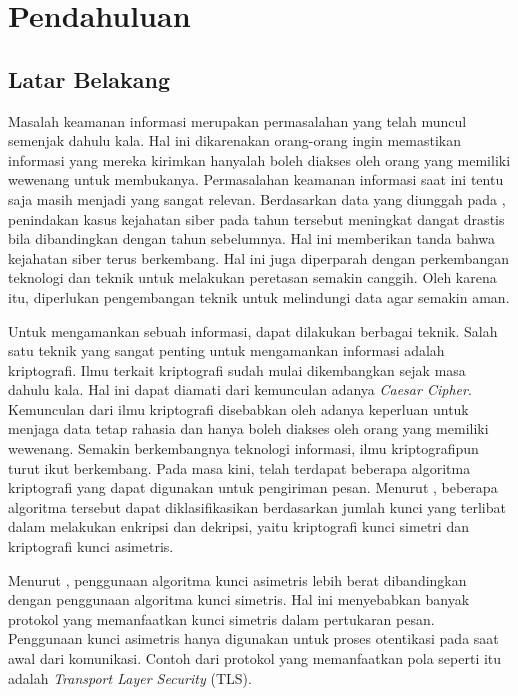 \chapter{Pendahuluan}

\section{Latar Belakang}
Masalah keamanan informasi merupakan permasalahan yang telah muncul semenjak dahulu kala. Hal ini dikarenakan orang-orang ingin memastikan informasi yang mereka kirimkan hanyalah boleh diakses oleh orang yang memiliki wewenang untuk membukanya. Permasalahan keamanan informasi saat ini tentu saja masih menjadi yang sangat relevan. Berdasarkan data yang diunggah pada \textcite{pusiknaspolri_cybercrime_2022}, penindakan kasus kejahatan siber pada tahun tersebut meningkat dangat drastis bila dibandingkan dengan tahun sebelumnya. Hal ini memberikan tanda bahwa kejahatan siber terus berkembang. Hal ini juga diperparah dengan perkembangan teknologi dan teknik untuk melakukan peretasan semakin canggih. Oleh karena itu, diperlukan pengembangan teknik untuk melindungi data agar semakin aman.

Untuk mengamankan sebuah informasi, dapat dilakukan berbagai teknik. Salah satu teknik yang sangat penting untuk mengamankan informasi adalah kriptografi. Ilmu terkait kriptografi sudah mulai dikembangkan sejak masa dahulu kala. Hal ini dapat diamati dari kemunculan adanya \emph{Caesar Cipher}. Kemunculan dari ilmu kriptografi disebabkan oleh adanya keperluan untuk menjaga data tetap rahasia dan hanya boleh diakses oleh orang yang memiliki wewenang. Semakin berkembangnya teknologi informasi, ilmu kriptografipun turut ikut berkembang. Pada masa kini, telah terdapat beberapa  algoritma kriptografi yang dapat digunakan untuk pengiriman pesan. Menurut \textcite{munir2019}, beberapa algoritma tersebut dapat diklasifikasikan berdasarkan jumlah kunci yang terlibat dalam melakukan enkripsi dan dekripsi, yaitu kriptografi kunci simetri dan kriptografi kunci asimetris.

Menurut \textcite{halak2022}, penggunaan algoritma kunci asimetris lebih berat dibandingkan dengan penggunaan algoritma kunci simetris. Hal ini menyebabkan banyak protokol yang memanfaatkan kunci simetris dalam pertukaran pesan. Penggunaan kunci asimetris hanya digunakan untuk proses otentikasi pada saat awal dari komunikasi. Contoh dari protokol yang memanfaatkan pola seperti itu adalah \emph{Transport Layer Security} (TLS).

